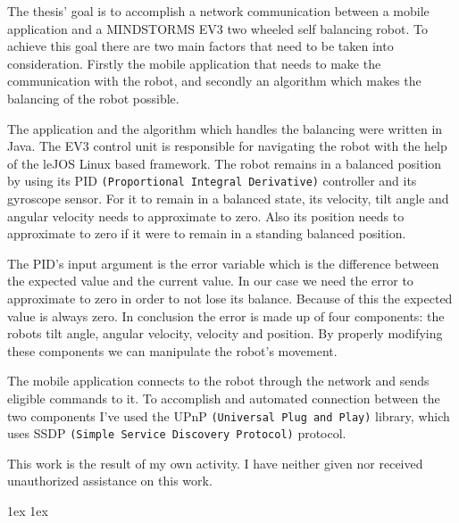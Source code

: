 \documentclass[final]{ubb_dolgozat}
\author{
Márton Zete-Örs
}
\begin{document}
\begin{abstractEN}
	
The thesis’ goal is to accomplish a network communication between a mobile application and a MINDSTORMS EV3 two wheeled self balancing robot. To achieve this goal there are two main factors that need to be taken into consideration. Firstly the mobile application that needs to make the communication with the robot, and secondly an algorithm which makes the balancing of the robot possible.

The application and the algorithm which handles the balancing were written in Java. The EV3 control unit is responsible for navigating the robot with the help of the leJOS Linux based framework. The robot remains in a balanced position by using its PID \texttt{(Proportional Integral Derivative)} controller and its gyroscope sensor. For it to remain in a balanced state, its velocity, tilt angle and angular velocity needs to approximate to zero. Also its position needs to approximate to zero if it were to remain in a standing balanced position.

The PID’s input argument is the error variable which is the difference between the expected value and the current value. In our case we need the error to approximate to zero in order to not lose its balance. Because of this the expected value is always zero. In conclusion the error is made up of four components: the robots tilt angle, angular velocity, velocity and position. By properly modifying these components we can manipulate the robot’s movement.

The mobile application connects to the robot through the network and sends eligible commands to it. To accomplish and automated connection between the two components I’ve used the UPnP \texttt{(Universal Plug and Play)} library, which uses SSDP \texttt{(Simple Service Discovery Protocol)} protocol.

This work is the result of my own activity. I have neither given nor received unauthorized assistance on this work.

\end{abstractEN}

\maketitle

{ \baselineskip 1ex
  \parskip 1ex
  \tableofcontents
}





%
%
%
\appendix

{ 
	\renewcommand{\baselinestretch}{1.1}\normalsize %
	\setlength{\itemsep}{-2.4mm}
	\setlength{\bibspacing}{0.67\baselineskip}
	
	
}
\end{document}
